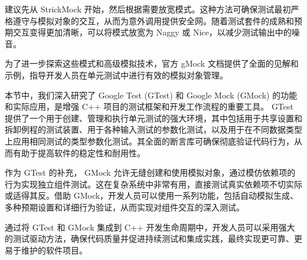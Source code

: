 建议先从 StrickMock 开始，然后根据需要放宽模式。这种方法可确保测试最初严格遵守与模拟对象的交互，从而为意外调用提供安全网。随着测试套件的成熟和预期交互变得更加清晰，可以将模式放宽为 Naggy 或 Nice，以减少测试输出中的噪音。

为了进一步探索这些模式和高级模拟技术，官方 gMock 文档提供了全面的见解和示例，指导开发人员在单元测试中进行有效的模拟对象管理。

本节中，我们深入研究了 Google Test (GTest) 和 Google Mock (GMock) 的功能和实际应用，是增强 C++ 项目的测试框架和开发工作流程的重要工具。 GTest 提供了一个用于创建、管理和执行单元测试的强大环境，其中包括用于共享设置和拆卸例程的测试装置、用于各种输入测试的参数化测试，以及用于在不同数据类型上应用相同测试的类型参数化测试。其全面的断言库可确保彻底验证代码行为，从而有助于提高软件的稳定性和耐用性。

作为 GTest 的补充， GMock 允许无缝创建和使用模拟对象，通过模仿依赖项的行为实现独立组件测试。这在复杂系统中非常有用，直接测试真实依赖项不切实际或适得其反。借助 GMock，开发人员可以使用一系列功能，包括自动模拟生成、多种预期设置和详细行为验证，从而实现对组件交互的深入测试。

通过将 GTest 和 GMock 集成到 C++ 开发生命周期中，开发人员可以采用强大的测试驱动方法，确保代码质量并促进持续测试和集成实践，最终实现更可靠、更易于维护的软件项目。





















